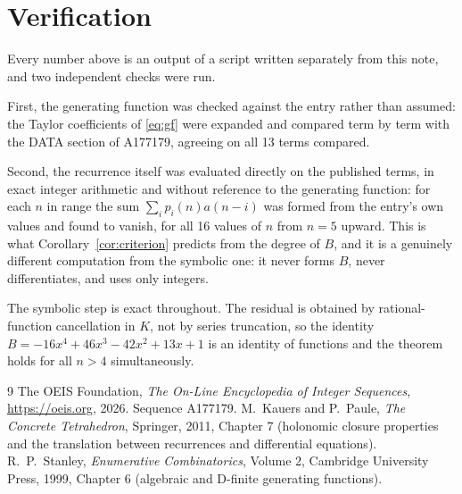 \documentclass[11pt,a4paper]{article}
\theoremstyle{plain}
\theoremstyle{definition}
\begin{document}
\section{Verification}

Every number above is an output of a script written separately from this note, and two
independent checks were run.

First, the generating function was checked against the entry rather than assumed: the
Taylor coefficients of \eqref{eq:gf} were expanded and compared term by term with the DATA
section of A177179, agreeing on all 13 terms compared.

Second, the recurrence itself was evaluated directly on the published terms, in exact
integer arithmetic and without reference to the generating function: for each $n$ in range
the sum $\sum_{i}p_{i}(n)a(n-i)$ was formed from the entry's own values and found to
vanish, for all 16 values of $n$ from $n=5$ upward. This is what
Corollary~\ref{cor:criterion} predicts from the degree of $B$, and it is a genuinely
different computation from the symbolic one: it never forms $B$, never differentiates, and
uses only integers.

The symbolic step is exact throughout. The residual is obtained by rational-function
cancellation in $K$, not by series truncation, so the identity $B=- 16 x^{4} + 46 x^{3} - 42 x^{2} + 13 x + 1$ is an
identity of functions and the theorem holds for all $n>4$ simultaneously.

\begin{thebibliography}{9}
 The OEIS Foundation, \emph{The On-Line Encyclopedia of Integer Sequences},
\url{https://oeis.org}, 2026. Sequence A177179.
 M.~Kauers and P.~Paule, \emph{The Concrete Tetrahedron}, Springer, 2011,
Chapter 7 (holonomic closure properties and the translation between recurrences and
differential equations).
 R.~P.~Stanley, \emph{Enumerative Combinatorics}, Volume 2, Cambridge
University Press, 1999, Chapter 6 (algebraic and D-finite generating functions).
\end{thebibliography}
\end{document}
